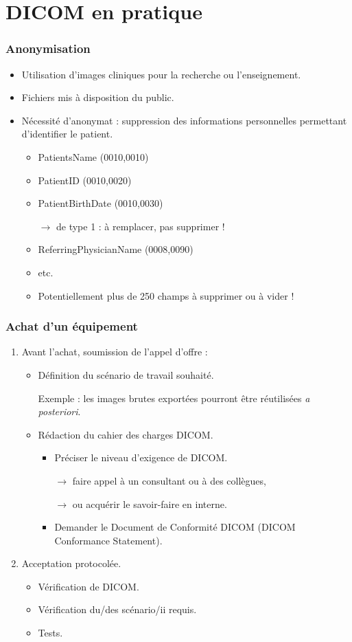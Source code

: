\section{DICOM en pratique}

\frame
{
	\frametitle{Anonymisation}
	\begin{itemize}
		\item Utilisation d'images cliniques pour la recherche ou l'enseignement.
		\item Fichiers mis \`a disposition du public.
		\item N\'ecessit\'e d'anonymat : suppression des informations personnelles permettant d'identifier le patient.
		\begin{itemize}
			\item PatientsName (0010,0010)
			\item PatientID (0010,0020)
			\item PatientBirthDate (0010,0030)
			
			$\rightarrow$ de type 1 : \`a remplacer, pas supprimer !
			\item ReferringPhysicianName (0008,0090)
			\item etc.
			\item Potentiellement plus de 250 champs \`a supprimer ou \`a vider !
		\end{itemize}
	\end{itemize}
}

\frame
{
	\frametitle{Achat d'un \'equipement}
	\begin{enumerate}
		\item Avant l'achat, soumission de l'appel d'offre :
		\begin{itemize}
			\item D\'efinition du sc\'enario de travail souhait\'e.

                Exemple : les images brutes export\'ees pourront \^etre r\'eutilis\'ees \emph{a posteriori}.
			\item R\'edaction du cahier des charges DICOM.
			\begin{itemize}
				\item Pr\'eciser le niveau d'exigence de DICOM.
				
				$\rightarrow$ faire appel \`a un consultant ou \`a des coll\`egues,
				
				$\rightarrow$ ou acqu\'erir le savoir-faire en interne.
				\item Demander le Document de Conformit\'e DICOM (DICOM Conformance Statement).
			\end{itemize}
		\end{itemize}
		\item Acceptation protocol\'ee.
		\begin{itemize}
			\item V\'erification de DICOM.
			\item V\'erification du/des sc\'enario/ii requis.
			\item Tests.
		\end{itemize}
	\end{enumerate}
}

